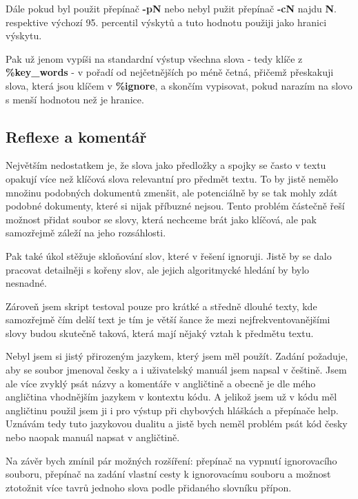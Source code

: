 \documentclass{article}
\def\cmd{\fontfamily{lmtt}\selectfont\textbf} %
\begin{document}
\par Dále pokud byl použit přepínač {\cmd {-pN}} nebo
nebyl pužit přepínač {\cmd {-cN}} najdu
{\cmd N}. respektive výchozí 95. percentil výskytů a
tuto hodnotu použiji jako hranici výskytu.

\par Pak už jenom vypíši na standardní výstup všechna slova
- tedy klíče z {\cmd {\%key\_words}} - v pořadí od nejčetnějších
po méně četná, přičemž přeskakuji slova, která jsou
klíčem v {\cmd {\%ignore}}, a skončím vypisovat, pokud narazím
na slovo s menší hodnotou než je hranice.

\subsection*{Reflexe a komentář}
\indent
\par Největším nedostatkem je, že slova jako předložky a spojky se často
v textu opakují více než klíčová slova relevantní pro předmět textu.
To by jistě nemělo množinu podobných dokumentů zmenšit, ale potenciálně
by se tak mohly  zdát podobné dokumenty, které si nijak příbuzné
nejsou. Tento problém částečně řeší možnost přidat soubor se slovy,
která nechceme brát jako klíčová, ale pak samozřejmě záleží na
jeho rozsáhlosti.

\par Pak také úkol stěžuje skloňování slov, které v řešení ignoruji.
Jistě by se dalo pracovat detailněji s kořeny slov, ale jejich
algoritmycké hledání by bylo nesnadné.

\par Zároveň jsem skript testoval pouze pro krátké a středně
dlouhé texty, kde samozřejmě čím delší text je tím je větší šance
že mezi nejfrekventovanějšími slovy budou skutečně taková,
která mají nějaký vztah k předmětu textu.

\par Nebyl jsem si jistý přirozeným jazykem, který jsem měl použít.
Zadání požaduje, aby se soubor jmenoval česky a i uživatelský
manuál jsem napsal v češtině. Jsem ale více zvyklý psát názvy a
komentáře v angličtině a obecně je dle mého angličtina vhodnějším
jazykem v kontextu kódu. A jelikož jsem už v kódu měl angličtinu
použil jsem ji i pro výstup při chybových hláškách a přepínače help.
Uznávám tedy tuto jazykovou dualitu a jistě bych neměl problém
psát kód česky nebo naopak manuál napsat v angličtině.

\par Na závěr bych zmínil pár možných rozšíření: přepínač na vypnutí
ignorovacího souboru, přepínač na zadání vlastní cesty k ignorovacímu
souboru a možnost ztotožnit více tavrů jednoho slova podle přidaného
slovníku přípon.
\end{document}
